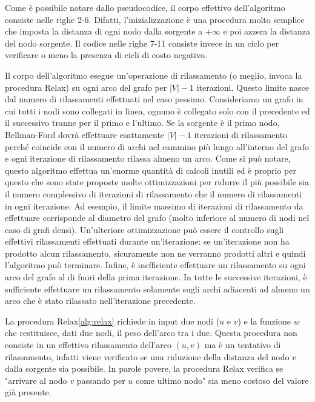 \documentclass[12pt,a4paper]{book}
\begin{document}
	Come è possibile notare dallo pseudocodice, il corpo effettivo dell'algoritmo consiste nelle righe 2-6. Difatti, l'inizializzazione è una procedura molto semplice che imposta la distanza di ogni nodo dalla sorgente a $+\infty$ e poi azzera la distanza del nodo sorgente. Il codice nelle righe 7-11 consiste invece in un ciclo per verificare o meno la presenza di cicli di costo negativo.
	
	Il corpo dell'algoritmo esegue un'operazione di rilassamento (o meglio, invoca la procedura Relax) su ogni arco del grafo per $|V|-1$ iterazioni. Questo limite nasce dal numero di rilassamenti effettuati nel caso pessimo. Consideriamo un grafo in cui tutti i nodi sono collegati in linea, ognuno è collegato solo con il precedente ed il successivo tranne per il primo e l'ultimo. Se la sorgente è il primo nodo, Bellman-Ford dovrà effettuare esattamente $|V|-1$ iterazioni di rilassamento perché coincide con il numero di archi nel cammino più lungo all'interno del grafo e ogni iterazione di rilassamento rilassa almeno un arco. Come si può notare, questo algoritmo effettua un'enorme quantità di calcoli inutili ed è proprio per questo che sono state proposte molte ottimizzazioni per ridurre il più possibile sia il numero complessivo di iterazioni di rilassamento che il numero di rilassamenti in ogni iterazione. Ad esempio, il limite massimo di iterazioni di rilassamento da effettuare corrisponde al diametro del grafo (molto inferiore al numero di nodi nel caso di grafi densi). Un'ulteriore ottimizzazione può essere il controllo sugli effettivi rilassamenti effettuati durante un'iterazione: se un'iterazione non ha prodotto alcun rilassamento, sicuramente non ne verranno prodotti altri e quindi l'algoritmo può terminare. Infine, è inefficiente effettuare un rilassamento su ogni arco del grafo al di fuori della prima iterazione. In tutte le successive iterazioni, è sufficiente effettuare un rilassamento solamente sugli archi adiacenti ad almeno un arco che è stato rilassato nell'iterazione precedente.
	
	La procedura Relax\ref{alg:relax} richiede in input due nodi ($u$ e $v$) e la funzione $w$ che restituisce, dati due nodi, il peso dell'arco tra i due. Questa procedura non consiste in un effettivo rilassamento dell'arco $(u,v)$ ma è un tentativo di rilassamento, infatti viene verificato se una riduzione della distanza del nodo $v$ dalla sorgente sia possibile. In parole povere, la procedura Relax verifica se "arrivare al nodo $v$ passando per $u$ come ultimo nodo" sia meno costoso del valore già presente.
	
\end{document}
